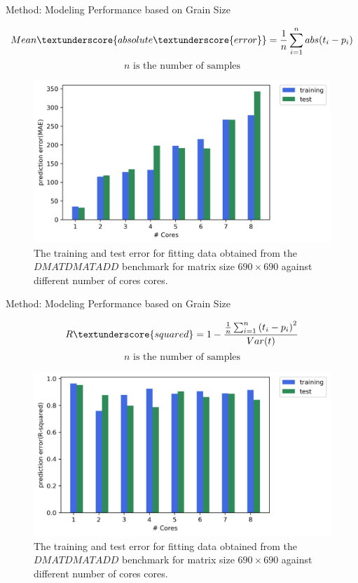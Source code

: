 \documentclass[10pt]{beamer}
\begin{document}
\begin{frame}{Method: Modeling Performance based on Grain Size}
	\begin{outline}	
		$$Mean\textunderscore{absolute\textunderscore{error}} = \frac{1}{n}\sum_{i=1}^{n} abs({t_i-p_i})$$
		$$n \text{ is the number of samples}$$
		\begin{figure}[H]
			\centering
			\includegraphics[scale=.5]{images/polyfit/error_690_mae.png}
			\caption{The training and test error for fitting data obtained from the $DMATDMATADD$ benchmark for matrix size $690\times690$ against different number of cores cores.}	
			\label{fig32}
		\end{figure}
	\end{outline}
\end{frame}

\begin{frame}{Method: Modeling Performance based on Grain Size}
	\begin{outline}	
		$$R\textunderscore{squared} = 1-\frac{{\frac{1}{n}\sum_{i=1}^{n}{(t_i-p_i)}^2}}{Var(t)}$$
		$$n \text{ is the number of samples}$$
		\begin{figure}[H]
			\centering
			\includegraphics[scale=.5]{images/polyfit/error_690_r2.png}
			\caption{The training and test error for fitting data obtained from the $DMATDMATADD$ benchmark for matrix size $690\times690$ against different number of cores cores.}	
			\label{fig33}
		\end{figure}
	\end{outline}
\end{frame}
\end{document}
